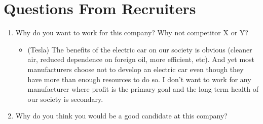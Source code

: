 \documentclass{article}
\begin{document}
\section{Questions From Recruiters}

\begin{enumerate}

\item Why do you want to work for this company?  Why not competitor X or Y?
	\begin{itemize}
	\item (Tesla) The benefits of the electric car on our society is
		obvious (cleaner air, reduced dependence on foreign oil,  more
		efficient, etc).  And yet most manufacturers choose not to
		develop an electric car even though they have more than enough
		resources to do so.  I don't want to work for any manufacturer
		where profit is the primary goal and the long term health of our
		society is secondary.
	\end{itemize}

\item Why do you think you would be a good candidate at this company?

\end{enumerate}

\clearpage
\printbibliography[heading=bibintoc]
\end{document}
